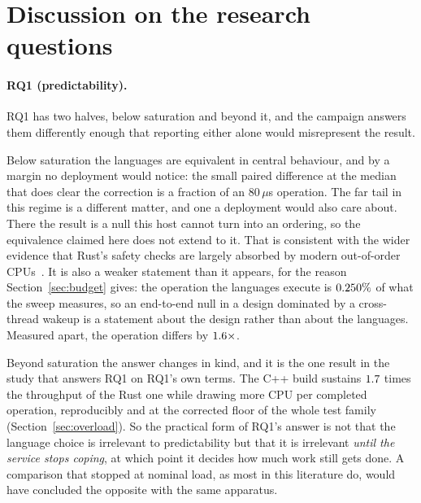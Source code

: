\documentclass[english,twoside,openright,a4paper,censored,csm,software-track-2020]{HYthesisML}
\begin{document}
\section{Discussion on the research questions}\label{sec:rqdiscussion}
\paragraph{RQ1 (predictability).} RQ1 has two halves, below saturation and beyond it, and the
campaign answers them differently enough that reporting either alone would misrepresent the
result.

Below saturation the languages are equivalent in central behaviour, and by a margin no deployment
would notice: the small paired difference at the median that does clear the correction is a
fraction of an $80\,\mu$s operation. The far tail in this regime is a different matter, and one a
deployment would also care about. There the result is a null this host cannot turn into an
ordering, so the equivalence claimed here does not extend to it. That is consistent with the wider evidence that
Rust's safety checks are largely absorbed by modern out-of-order
CPUs~\cite{balasubramanian2017rust,emmerich2019drivers}. It is also a weaker statement than it
appears, for the reason Section~\ref{sec:budget} gives: the operation the
languages execute is $0.250\%$ of what the sweep measures, so an end-to-end null in
a design dominated by a cross-thread wakeup is a statement about the design rather than about the
languages. Measured apart, the operation differs by $1.6\times$.

Beyond saturation the answer changes in kind, and it is the one result in the study that answers
RQ1 on RQ1's own terms. The C++ build sustains $1.7$ times the throughput of the
Rust one while drawing more CPU per completed operation, reproducibly and at the corrected floor
of the whole test family (Section~\ref{sec:overload}). So the practical form of RQ1's answer is
not that the language choice is irrelevant to predictability
but that it is irrelevant \emph{until the service stops coping}, at which point it decides how
much work still gets done. A comparison that stopped at nominal load, as most in this literature
do, would have concluded the opposite with the same apparatus.
\end{document}

